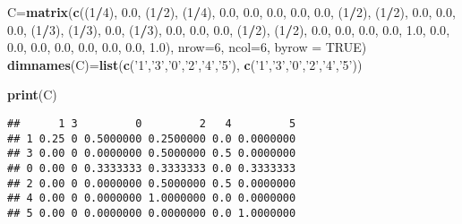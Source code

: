 \documentclass[]{article}
\newenvironment{Shaded}{\begin{snugshade}}{\end{snugshade}}
\newcommand{\DataTypeTok}[1]{\textcolor[rgb]{0.13,0.29,0.53}{#1}}
\newcommand{\DecValTok}[1]{\textcolor[rgb]{0.00,0.00,0.81}{#1}}
\newcommand{\FloatTok}[1]{\textcolor[rgb]{0.00,0.00,0.81}{#1}}
\newcommand{\KeywordTok}[1]{\textcolor[rgb]{0.13,0.29,0.53}{\textbf{#1}}}
\newcommand{\NormalTok}[1]{#1}
\newcommand{\OperatorTok}[1]{\textcolor[rgb]{0.81,0.36,0.00}{\textbf{#1}}}
\newcommand{\OtherTok}[1]{\textcolor[rgb]{0.56,0.35,0.01}{#1}}
\newcommand{\StringTok}[1]{\textcolor[rgb]{0.31,0.60,0.02}{#1}}
\begin{document}
\begin{Shaded}
\begin{Highlighting}[]
\NormalTok{C=}\KeywordTok{matrix}\NormalTok{(}\KeywordTok{c}\NormalTok{((}\DecValTok{1}\OperatorTok{/}\DecValTok{4}\NormalTok{), }\FloatTok{0.0}\NormalTok{, (}\DecValTok{1}\OperatorTok{/}\DecValTok{2}\NormalTok{), (}\DecValTok{1}\OperatorTok{/}\DecValTok{4}\NormalTok{), }\FloatTok{0.0}\NormalTok{, }\FloatTok{0.0}\NormalTok{, }
           \FloatTok{0.0}\NormalTok{, }\FloatTok{0.0}\NormalTok{, }\FloatTok{0.0}\NormalTok{, (}\DecValTok{1}\OperatorTok{/}\DecValTok{2}\NormalTok{), (}\DecValTok{1}\OperatorTok{/}\DecValTok{2}\NormalTok{), }\FloatTok{0.0}\NormalTok{, }
           \FloatTok{0.0}\NormalTok{, }\FloatTok{0.0}\NormalTok{, (}\DecValTok{1}\OperatorTok{/}\DecValTok{3}\NormalTok{), (}\DecValTok{1}\OperatorTok{/}\DecValTok{3}\NormalTok{), }\FloatTok{0.0}\NormalTok{, (}\DecValTok{1}\OperatorTok{/}\DecValTok{3}\NormalTok{),}
           \FloatTok{0.0}\NormalTok{, }\FloatTok{0.0}\NormalTok{, }\FloatTok{0.0}\NormalTok{, (}\DecValTok{1}\OperatorTok{/}\DecValTok{2}\NormalTok{), (}\DecValTok{1}\OperatorTok{/}\DecValTok{2}\NormalTok{), }\FloatTok{0.0}\NormalTok{,}
           \FloatTok{0.0}\NormalTok{, }\FloatTok{0.0}\NormalTok{, }\FloatTok{0.0}\NormalTok{, }\FloatTok{1.0}\NormalTok{, }\FloatTok{0.0}\NormalTok{, }\FloatTok{0.0}\NormalTok{, }
           \FloatTok{0.0}\NormalTok{, }\FloatTok{0.0}\NormalTok{, }\FloatTok{0.0}\NormalTok{, }\FloatTok{0.0}\NormalTok{, }\FloatTok{0.0}\NormalTok{, }\FloatTok{1.0}\NormalTok{), }\DataTypeTok{nrow=}\DecValTok{6}\NormalTok{, }\DataTypeTok{ncol=}\DecValTok{6}\NormalTok{, }\DataTypeTok{byrow =} \OtherTok{TRUE}\NormalTok{)}
\KeywordTok{dimnames}\NormalTok{(C)=}\KeywordTok{list}\NormalTok{(}\KeywordTok{c}\NormalTok{(}\StringTok{'1'}\NormalTok{,}\StringTok{'3'}\NormalTok{,}\StringTok{'0'}\NormalTok{,}\StringTok{'2'}\NormalTok{,}\StringTok{'4'}\NormalTok{,}\StringTok{'5'}\NormalTok{), }\KeywordTok{c}\NormalTok{(}\StringTok{'1'}\NormalTok{,}\StringTok{'3'}\NormalTok{,}\StringTok{'0'}\NormalTok{,}\StringTok{'2'}\NormalTok{,}\StringTok{'4'}\NormalTok{,}\StringTok{'5'}\NormalTok{))}

\KeywordTok{print}\NormalTok{(C)}
\end{Highlighting}
\end{Shaded}

\begin{verbatim}
##      1 3         0         2   4         5
## 1 0.25 0 0.5000000 0.2500000 0.0 0.0000000
## 3 0.00 0 0.0000000 0.5000000 0.5 0.0000000
## 0 0.00 0 0.3333333 0.3333333 0.0 0.3333333
## 2 0.00 0 0.0000000 0.5000000 0.5 0.0000000
## 4 0.00 0 0.0000000 1.0000000 0.0 0.0000000
## 5 0.00 0 0.0000000 0.0000000 0.0 1.0000000
\end{verbatim}
\end{document}

